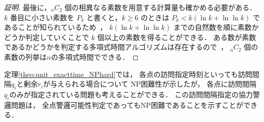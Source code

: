 \begin{proof}[証明]
  最後に，${}_n C_2$ 個の相異なる素数を用意する計算量も確かめる必要がある．
  $k$ 番目に小さい素数を $P_k$ と書くと，$k \geq 6$ のときは
  $P_k < k( \ln k + \ln\ln k )$ であることが知られているため~\cite{dusart1999k}，
  $k( \ln k + \ln\ln k )$ までの自然数を順に素数かどうか判定していくことで
  $k$ 個以上の素数を得ることができる．
  ある数が素数であるかどうかを判定する多項式時間アルゴリズムは存在するので~\cite{agrawal2004primes}，
  ${}_n C_2$ 個の素数の列挙は$n$の多項式時間でできる．
\end{proof}



定理\ref{theo:unit_exacttime_NPhard}では，
各点の訪問指定時刻といっても訪問間隔$q_i$と剰余$r_i$が与えられる場合について
NP困難性が示したが，
各点に訪問間隔$q_i$のみが指定されている問題も考えることができる．
この訪問間隔指定の協力警邏問題は，
全点警邏可能性判定であってもNP困難であることを示すことができる．





